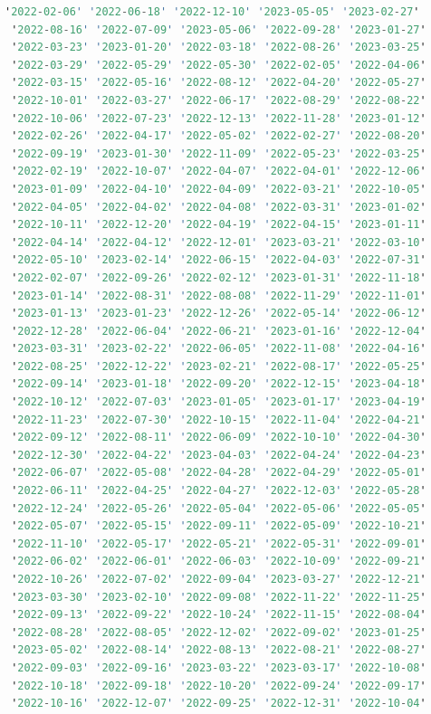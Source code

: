 \begin{lstlisting}[language=haskell, caption=Valores por columna, captionpos=b, label=lst:fiboHaskell]
 '2022-02-06' '2022-06-18' '2022-12-10' '2023-05-05' '2023-02-27'
 '2022-08-16' '2022-07-09' '2023-05-06' '2022-09-28' '2023-01-27'
 '2022-03-23' '2023-01-20' '2022-03-18' '2022-08-26' '2023-03-25'
 '2022-03-29' '2022-05-29' '2022-05-30' '2022-02-05' '2022-04-06'
 '2022-03-15' '2022-05-16' '2022-08-12' '2022-04-20' '2022-05-27'
 '2022-10-01' '2022-03-27' '2022-06-17' '2022-08-29' '2022-08-22'
 '2022-10-06' '2022-07-23' '2022-12-13' '2022-11-28' '2023-01-12'
 '2022-02-26' '2022-04-17' '2022-05-02' '2022-02-27' '2022-08-20'
 '2022-09-19' '2023-01-30' '2022-11-09' '2022-05-23' '2022-03-25'
 '2022-02-19' '2022-10-07' '2022-04-07' '2022-04-01' '2022-12-06'
 '2023-01-09' '2022-04-10' '2022-04-09' '2022-03-21' '2022-10-05'
 '2022-04-05' '2022-04-02' '2022-04-08' '2022-03-31' '2023-01-02'
 '2022-10-11' '2022-12-20' '2022-04-19' '2022-04-15' '2023-01-11'
 '2022-04-14' '2022-04-12' '2022-12-01' '2023-03-21' '2022-03-10'
 '2022-05-10' '2023-02-14' '2022-06-15' '2022-04-03' '2022-07-31'
 '2022-02-07' '2022-09-26' '2022-02-12' '2023-01-31' '2022-11-18'
 '2023-01-14' '2022-08-31' '2022-08-08' '2022-11-29' '2022-11-01'
 '2023-01-13' '2023-01-23' '2022-12-26' '2022-05-14' '2022-06-12'
 '2022-12-28' '2022-06-04' '2022-06-21' '2023-01-16' '2022-12-04'
 '2023-03-31' '2023-02-22' '2022-06-05' '2022-11-08' '2022-04-16'
 '2022-08-25' '2022-12-22' '2023-02-21' '2022-08-17' '2022-05-25'
 '2022-09-14' '2023-01-18' '2022-09-20' '2022-12-15' '2023-04-18'
 '2022-10-12' '2022-07-03' '2023-01-05' '2023-01-17' '2023-04-19'
 '2022-11-23' '2022-07-30' '2022-10-15' '2022-11-04' '2022-04-21'
 '2022-09-12' '2022-08-11' '2022-06-09' '2022-10-10' '2022-04-30'
 '2022-12-30' '2022-04-22' '2023-04-03' '2022-04-24' '2022-04-23'
 '2022-06-07' '2022-05-08' '2022-04-28' '2022-04-29' '2022-05-01'
 '2022-06-11' '2022-04-25' '2022-04-27' '2022-12-03' '2022-05-28'
 '2022-12-24' '2022-05-26' '2022-05-04' '2022-05-06' '2022-05-05'
 '2022-05-07' '2022-05-15' '2022-09-11' '2022-05-09' '2022-10-21'
 '2022-11-10' '2022-05-17' '2022-05-21' '2022-05-31' '2022-09-01'
 '2022-06-02' '2022-06-01' '2022-06-03' '2022-10-09' '2022-09-21'
 '2022-10-26' '2022-07-02' '2022-09-04' '2023-03-27' '2022-12-21'
 '2023-03-30' '2023-02-10' '2022-09-08' '2022-11-22' '2022-11-25'
 '2022-09-13' '2022-09-22' '2022-10-24' '2022-11-15' '2022-08-04'
 '2022-08-28' '2022-08-05' '2022-12-02' '2022-09-02' '2023-01-25'
 '2023-05-02' '2022-08-14' '2022-08-13' '2022-08-21' '2022-08-27'
 '2022-09-03' '2022-09-16' '2023-03-22' '2023-03-17' '2022-10-08'
 '2022-10-18' '2022-09-18' '2022-10-20' '2022-09-24' '2022-09-17'
 '2022-10-16' '2022-12-07' '2022-09-25' '2022-12-31' '2022-10-04'

\end{lstlisting}
